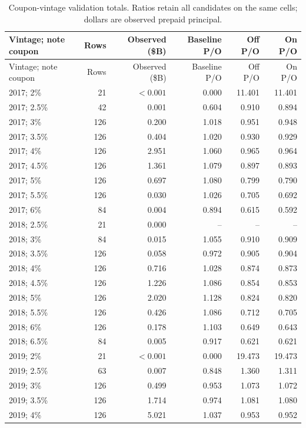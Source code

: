 {\small
\begin{longtable}{@{}lrrrrr@{}}
\caption{Coupon-vintage validation totals. Ratios retain all candidates on the same cells; dollars are observed prepaid principal.}\label{tab:validcells}\\
\toprule
Vintage; note coupon & Rows & Observed (\$B) & Baseline P/O & Off P/O & On P/O\\\midrule
\endfirsthead
\toprule
Vintage; note coupon & Rows & Observed (\$B) & Baseline P/O & Off P/O & On P/O\\\midrule
\endhead
2017; 2\% & 21 & $<0.001$ & 0.000 & 11.401 & 11.401\\
2017; 2.5\% & 42 & 0.001 & 0.604 & 0.910 & 0.894\\
2017; 3\% & 126 & 0.200 & 1.018 & 0.951 & 0.948\\
2017; 3.5\% & 126 & 0.404 & 1.020 & 0.930 & 0.929\\
2017; 4\% & 126 & 2.951 & 1.060 & 0.965 & 0.964\\
2017; 4.5\% & 126 & 1.361 & 1.079 & 0.897 & 0.893\\
2017; 5\% & 126 & 0.697 & 1.080 & 0.799 & 0.790\\
2017; 5.5\% & 126 & 0.030 & 1.026 & 0.705 & 0.692\\
2017; 6\% & 84 & 0.004 & 0.894 & 0.615 & 0.592\\
2018; 2.5\% & 21 & 0.000 & -- & -- & --\\
2018; 3\% & 84 & 0.015 & 1.055 & 0.910 & 0.909\\
2018; 3.5\% & 126 & 0.058 & 0.972 & 0.905 & 0.904\\
2018; 4\% & 126 & 0.716 & 1.028 & 0.874 & 0.873\\
2018; 4.5\% & 126 & 1.226 & 1.086 & 0.854 & 0.853\\
2018; 5\% & 126 & 2.020 & 1.128 & 0.824 & 0.820\\
2018; 5.5\% & 126 & 0.426 & 1.086 & 0.712 & 0.705\\
2018; 6\% & 126 & 0.178 & 1.103 & 0.649 & 0.643\\
2018; 6.5\% & 84 & 0.005 & 0.917 & 0.621 & 0.621\\
2019; 2\% & 21 & $<0.001$ & 0.000 & 19.473 & 19.473\\
2019; 2.5\% & 63 & 0.007 & 0.848 & 1.360 & 1.311\\
2019; 3\% & 126 & 0.499 & 0.953 & 1.073 & 1.072\\
2019; 3.5\% & 126 & 1.714 & 0.974 & 1.081 & 1.080\\
2019; 4\% & 126 & 5.021 & 1.037 & 0.953 & 0.952\\

\end{longtable}}
